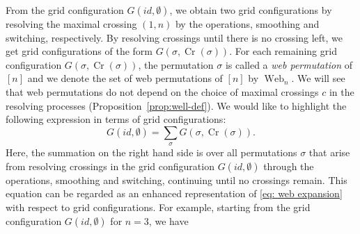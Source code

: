 \documentclass[reqno,12pt]{amsart}
\theoremstyle{definition}
\theoremstyle{remark}
\newcommand\Cr{\operatorname{Cr}}
\newcommand\Web{\operatorname{Web}}
\begin{document}
From the grid configuration $G(id, \emptyset)$, we obtain two grid
configurations by resolving the maximal crossing \( (1,n) \)
by the operations, smoothing and switching, respectively.
By resolving crossings until there is no crossing left,
we get grid configurations of the form $G(\sigma, \Cr(\sigma))$.
For each remaining grid configuration $G(\sigma, \Cr(\sigma))$,
the permutation $\sigma$ is called a \emph{web permutation} of $[n]$ and
we denote the set of web permutations of $[n]$ by $\Web_n$.
We will see that web permutations do not depend on the choice of maximal
crossings \( c \) in the resolving processes (Proposition~\ref{prop:well-def}).
We would like to highlight the following expression in terms of grid configurations:
\begin{equation}\label{Equation: empty grid=sum of grid}
G(id, \emptyset) = \sum_{\sigma} G(\sigma, \Cr(\sigma)).
\end{equation}
Here, the summation on the right hand side is over all permutations $\sigma$ that arise from resolving crossings in the grid configuration $G(id, \emptyset)$ through the operations, smoothing and switching, continuing until no crossings remain. This equation can be regarded as an enhanced representation of \eqref{eq: web expansion} with respect to grid configurations.
For example, starting from the grid configuration $G(id,\emptyset)$ for $n=3$,
we have 
\end{document}
